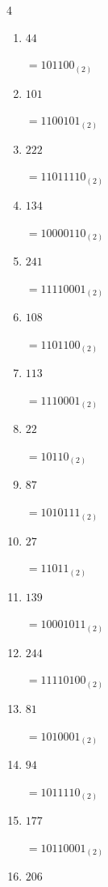 \begin{multicols}{4}
\begin{enumerate}
        $=11110100_{(2)}$

  \item $44$

        $=101100_{(2)}$

  \item $101$

        $=1100101_{(2)}$

  \item $222$

        $=11011110_{(2)}$

  \item $134$

        $=10000110_{(2)}$

  \item $241$

        $=11110001_{(2)}$

  \item $108$

        $=1101100_{(2)}$

  \item $113$

        $=1110001_{(2)}$

\columnbreak %

  \item $22$

        $=10110_{(2)}$

  \item $87$

        $=1010111_{(2)}$

  \item $27$

        $=11011_{(2)}$

  \item $139$

        $=10001011_{(2)}$

  \item $244$

        $=11110100_{(2)}$

  \item $81$

        $=1010001_{(2)}$

  \item $94$

        $=1011110_{(2)}$

  \item $177$

        $=10110001_{(2)}$

  \item $206$


\end{enumerate}
\end{multicols}
